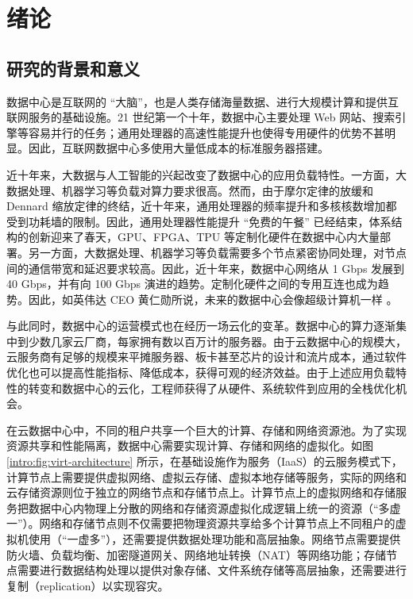 \chapter{绪论}

\section{研究的背景和意义}


数据中心是互联网的 ``大脑''，也是人类存储海量数据、进行大规模计算和提供互联网服务的基础设施。21 世纪第一个十年，数据中心主要处理 Web 网站、搜索引擎等容易并行的任务；通用处理器的高速性能提升也使得专用硬件的优势不甚明显。因此，互联网数据中心多使用大量低成本的标准服务器搭建。

近十年来，大数据与人工智能的兴起改变了数据中心的应用负载特性。一方面，大数据处理、机器学习等负载对算力要求很高。然而，由于摩尔定律的放缓和 Dennard 缩放定律的终结，近十年来，通用处理器的频率提升和多核核数增加都受到功耗墙的限制。因此，通用处理器性能提升 ``免费的午餐'' 已经结束，体系结构的创新迎来了春天，GPU、FPGA、TPU 等定制化硬件在数据中心内大量部署。另一方面，大数据处理、机器学习等负载需要多个节点紧密协同处理，对节点间的通信带宽和延迟要求较高。因此，近十年来，数据中心网络从 1 Gbps 发展到 40 Gbps，并有向 100 Gbps 演进的趋势。定制化硬件之间的专用互连也成为趋势。因此，如英伟达 CEO 黄仁勋所说，未来的数据中心会像超级计算机一样 \cite{nvidia-datacenter}。

与此同时，数据中心的运营模式也在经历一场云化的变革。数据中心的算力逐渐集中到少数几家云厂商，每家拥有数以百万计的服务器。由于云数据中心的规模大，云服务商有足够的规模来平摊服务器、板卡甚至芯片的设计和流片成本，通过软件优化也可以提高性能指标、降低成本，获得可观的经济效益。由于上述应用负载特性的转变和数据中心的云化，工程师获得了从硬件、系统软件到应用的全栈优化机会。

在云数据中心中，不同的租户共享一个巨大的计算、存储和网络资源池。为了实现资源共享和性能隔离，数据中心需要实现计算、存储和网络的虚拟化。如图 \ref{intro:fig:virt-architecture} 所示，在基础设施作为服务（IaaS）的云服务模式下，计算节点上需要提供虚拟网络、虚拟云存储、虚拟本地存储等服务，实际的网络和云存储资源则位于独立的网络节点和存储节点上。计算节点上的虚拟网络和存储服务把数据中心内物理上分散的网络和存储资源虚拟化成逻辑上统一的资源（``多虚一''）。网络和存储节点则不仅需要把物理资源共享给多个计算节点上不同租户的虚拟机使用（``一虚多''），还需要提供数据处理功能和高层抽象。网络节点需要提供防火墙、负载均衡、加密隧道网关、网络地址转换（NAT）等网络功能；存储节点需要进行数据结构处理以提供对象存储、文件系统存储等高层抽象，还需要进行复制（replication）以实现容灾。


